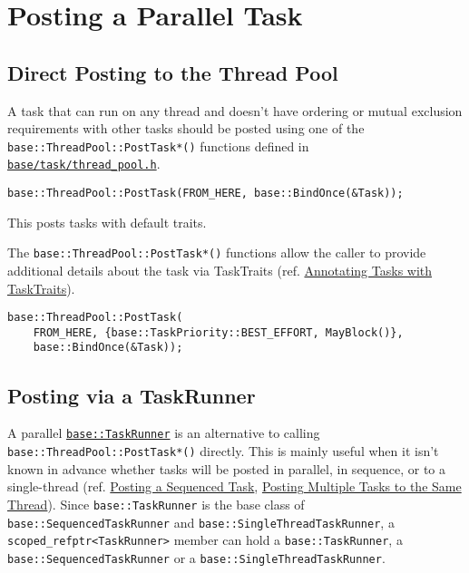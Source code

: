 \documentclass[a4paper,12pt,notitlepage,twoside,openright]{article}
\begin{document}
\hypertarget{posting-a-parallel-task}{%
\section{Posting a Parallel Task}\label{posting-a-parallel-task}}

\hypertarget{direct-posting-to-the-thread-pool}{%
\subsection{Direct Posting to the Thread
Pool}\label{direct-posting-to-the-thread-pool}}

A task that can run on any thread and doesn't have ordering or mutual
exclusion requirements with other tasks should be posted using one of
the \texttt{base::ThreadPool::PostTask*()} functions defined in
\href{https://cs.chromium.org/chromium/src/base/task/thread_pool.h}{\texttt{base/task/thread\_pool.h}}.

\begin{verbatim}
base::ThreadPool::PostTask(FROM_HERE, base::BindOnce(&Task));
\end{verbatim}

This posts tasks with default traits.

The \texttt{base::ThreadPool::PostTask*()} functions allow the caller to
provide additional details about the task via TaskTraits (ref.
\protect\hyperlink{Annotating-Tasks-with-TaskTraits}{Annotating Tasks
with TaskTraits}).

\begin{verbatim}
base::ThreadPool::PostTask(
    FROM_HERE, {base::TaskPriority::BEST_EFFORT, MayBlock()},
    base::BindOnce(&Task));
\end{verbatim}

\hypertarget{posting-via-a-taskrunner}{%
\subsection{Posting via a
TaskRunner}\label{posting-via-a-taskrunner}}

A parallel
\href{https://cs.chromium.org/chromium/src/base/task_runner.h}{\texttt{base::TaskRunner}}
is an alternative to calling \texttt{base::ThreadPool::PostTask*()}
directly. This is mainly useful when it isn't known in advance whether
tasks will be posted in parallel, in sequence, or to a single-thread
(ref. \protect\hyperlink{Posting-a-Sequenced-Task}{Posting a Sequenced
Task},
\protect\hyperlink{Posting-Multiple-Tasks-to-the-Same-Thread}{Posting
Multiple Tasks to the Same Thread}). Since \texttt{base::TaskRunner} is
the base class of \texttt{base::SequencedTaskRunner} and
\texttt{base::SingleThreadTaskRunner}, a
\texttt{scoped\_refptr\textless{}TaskRunner\textgreater{}} member can
hold a \texttt{base::TaskRunner}, a \texttt{base::SequencedTaskRunner}
or a \texttt{base::SingleThreadTaskRunner}.
\end{document}
